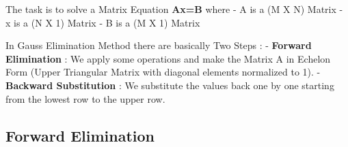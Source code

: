 \documentclass[11pt]{article}
\begin{document}
    The task is to solve a Matrix Equation \textbf{Ax=B} where - A is a (M X
N) Matrix - x is a (N X 1) Matrix - B is a (M X 1) Matrix

    In Gauss Elimination Method there are basically Two Steps : -
\textbf{Forward Elimination} : We apply some operations and make the
Matrix A in Echelon Form (Upper Triangular Matrix with diagonal elements
normalized to 1). - \textbf{Backward Substitution} : We substitute the
values back one by one starting from the lowest row to the upper row.

    \hypertarget{forward-elimination}{%
\subsection{Forward Elimination}\label{forward-elimination}}
\end{document}
